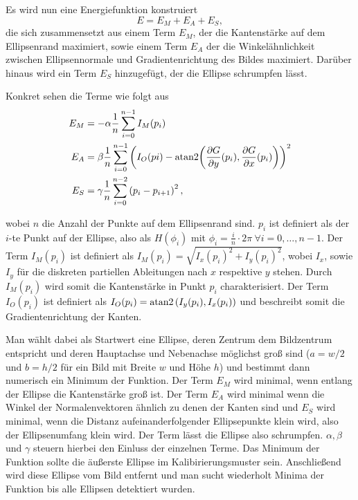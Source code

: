 Es wird nun eine Energiefunktion konstruiert
\[
	E = E_M + E_A + E_S,
\]
die sich zusammensetzt aus einem Term $E_M$, der die Kantenstärke auf dem Ellipsenrand maximiert, sowie einem Term $E_A$ der die Winkelähnlichkeit zwischen Ellipsennormale und Gradientenrichtung des Bildes maximiert. Darüber hinaus wird ein Term $E_S$ hinzugefügt, der die Ellipse schrumpfen lässt.

Konkret sehen die Terme wie folgt aus
\begin{equation}\label{eq:deformTerms}
	\begin{aligned}
		E_M &= -\alpha\frac{1}{n}\sum_{i=0}^{n-1}I_M(p_i) \\
		E_A &= \beta\frac{1}{n}\sum_{i=0}^{n-1}\left(I_O(pi) - \text{atan2}{\left(\frac{\partial G}{\partial y}(p_i), \frac{\partial G}{\partial x}(p_i)\right)}\right)^2 \\
		E_S &= \gamma\frac{1}{n}\sum_{i=0}^{n-2}\left(p_i - p_{i+1}\right)^2,
	\end{aligned}
\end{equation}

wobei $n$ die Anzahl der Punkte auf dem Ellipsenrand sind. $p_i$ ist definiert als der $i$-te Punkt auf der Ellipse, also als $H(\phi_i)$ mit $\phi_i = \frac{i}{n}\cdot2\pi ~\forall i = 0,\dotsc,n-1$.
Der Term $I_M(p_i)$ ist definiert als $I_M(p_i) = \sqrt{I_x(p_i)^2 + I_y(p_i)^2}$, wobei $I_x$, sowie $I_y$ für die diskreten partiellen Ableitungen nach $x$ respektive $y$ stehen. Durch $I_M(p_i)$ wird somit die Kantenstärke in Punkt $p_i$ charakterisiert. Der Term $I_O(p_i)$ ist definiert als $I_O(p_i) = \text{atan2}\left(I_y(p_i),I_x(p_i)\right)$
und beschreibt somit die Gradientenrichtung der Kanten.

Man wählt dabei als Startwert eine Ellipse, deren Zentrum dem Bildzentrum entspricht und deren Hauptachse und Nebenachse möglichst groß sind ($a = w/2$ und $b = h/2$ für ein Bild mit Breite $w$ und Höhe $h$) und bestimmt dann numerisch ein Minimum der Funktion. Der Term $E_M$ wird minimal, wenn entlang der Ellipse die Kantenstärke groß ist. Der Term $E_A$ wird minimal wenn die Winkel der Normalenvektoren ähnlich zu denen der Kanten sind und $E_S$ wird minimal, wenn die Distanz aufeinanderfolgender Ellipsepunkte klein wird, also der Ellipsenumfang klein wird. Der Term lässt die Ellipse also schrumpfen. $\alpha, \beta$ und $\gamma$ steuern hierbei den Einluss der einzelnen Terme. Das Minimum der Funktion sollte die äußerste Ellipse im Kalibirierungsmuster sein. Anschließend wird diese Ellipse vom Bild entfernt und man sucht wiederholt Minima der Funktion bis alle Ellipsen detektiert wurden.




